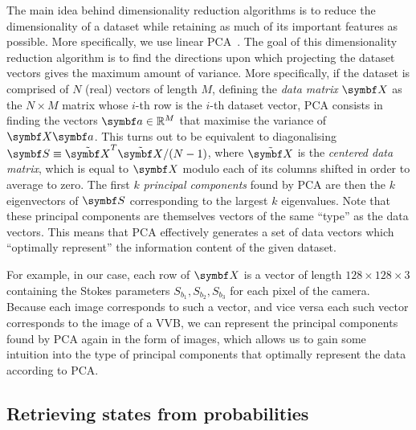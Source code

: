 The main idea behind dimensionality reduction algorithms is to reduce the dimensionality of a dataset while retaining as much of its important features as possible. More specifically, we use linear \ac{PCA}~\cite{jolliffe2016principal}. The goal of this dimensionality reduction algorithm is to find the directions upon which projecting the dataset vectors gives the maximum amount of variance. More specifically, if the dataset is comprised of $N$ (real) vectors of length $M$, defining the \emph{data matrix} $\bs X$ as the $N\times M$ matrix whose $i$-th row is the $i$-th dataset vector, \ac{PCA} consists in finding the vectors $\bs a\in\RR^{M}$ that maximise the variance of $\bs X\bs a$. This turns out to be equivalent to diagonalising $\bs S\equiv \tilde{\bs X}^T\tilde{\bs X}/(N-1)$, where $\tilde{\bs X}$ is the \emph{centered data matrix}, which is equal to $\bs X$ modulo each of its columns shifted in order to average to zero.
The first $k$ \emph{principal components} found by \ac{PCA} are then the $k$ eigenvectors of $\bs S$ corresponding to the largest $k$ eigenvalues.
Note that these principal components are themselves vectors of the same ``type'' as the data vectors. This means that \ac{PCA} effectively generates a set of data vectors which ``optimally represent'' the information content of the given dataset.

For example, in our case, each row of $\bs X$ is a vector of length $128\times128\times3$ containing the Stokes parameters $S_{b_1}, S_{b_2}, S_{b_3}$ for each pixel of the camera.
Because each image corresponds to such a vector, and vice versa each such vector corresponds to the image of a \ac{VVB}, we can represent the principal components found by \ac{PCA} again in the form of images, which allows us to gain some intuition into the type of principal components that optimally represent the data according to \ac{PCA}.

\subsection{Retrieving states from probabilities}

